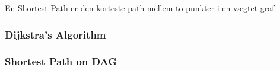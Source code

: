 En Shortest Path er den korteste path mellem to punkter i en vægtet graf

\subsubsection{Dijkstra's Algorithm}


\subsubsection{Shortest Path on DAG}
